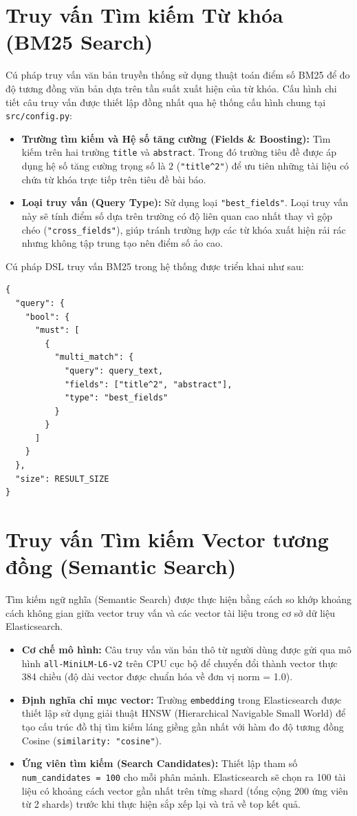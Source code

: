 \section{Truy vấn Tìm kiếm Từ khóa (BM25 Search)}
Cú pháp truy vấn văn bản truyền thống sử dụng thuật toán điểm số BM25 để đo độ tương đồng văn bản dựa trên tần suất xuất hiện của từ khóa. 
Cấu hình chi tiết câu truy vấn được thiết lập đồng nhất qua hệ thống cấu hình chung tại \texttt{src/config.py}:
\begin{itemize}
    \item \textbf{Trường tìm kiếm và Hệ số tăng cường (Fields \& Boosting):} Tìm kiếm trên hai trường \texttt{title} và \texttt{abstract}. Trong đó trường tiêu đề được áp dụng hệ số tăng cường trọng số là $2$ (\texttt{"title\^{}2"}) để ưu tiên những tài liệu có chứa từ khóa trực tiếp trên tiêu đề bài báo.
    \item \textbf{Loại truy vấn (Query Type):} Sử dụng loại \texttt{"best\_fields"}. Loại truy vấn này sẽ tính điểm số dựa trên trường có độ liên quan cao nhất thay vì gộp chéo (\texttt{"cross\_fields"}), giúp tránh trường hợp các từ khóa xuất hiện rải rác nhưng không tập trung tạo nên điểm số ảo cao.
\end{itemize}

Cú pháp DSL truy vấn BM25 trong hệ thống được triển khai như sau:
\begin{lstlisting}[caption={Elasticsearch BM25 Query DSL},label={lst:bm25-dsl}]
{
  "query": {
    "bool": {
      "must": [
        {
          "multi_match": {
            "query": query_text,
            "fields": ["title^2", "abstract"],
            "type": "best_fields"
          }
        }
      ]
    }
  },
  "size": RESULT_SIZE
}
\end{lstlisting}

\section{Truy vấn Tìm kiếm Vector tương đồng (Semantic Search)}
Tìm kiếm ngữ nghĩa (Semantic Search) được thực hiện bằng cách so khớp khoảng cách không gian giữa vector truy vấn và các vector tài liệu trong cơ sở dữ liệu Elasticsearch.
\begin{itemize}
    \item \textbf{Cơ chế mô hình:} Câu truy vấn văn bản thô từ người dùng được gửi qua mô hình \texttt{all-MiniLM-L6-v2} trên CPU cục bộ để chuyển đổi thành vector thực 384 chiều (độ dài vector được chuẩn hóa về đơn vị norm = 1.0).
    \item \textbf{Định nghĩa chỉ mục vector:} Trường \texttt{embedding} trong Elasticsearch được thiết lập sử dụng giải thuật HNSW (Hierarchical Navigable Small World) để tạo cấu trúc đồ thị tìm kiếm láng giềng gần nhất với hàm đo độ tương đồng Cosine (\texttt{similarity: "cosine"}).
    \item \textbf{Ứng viên tìm kiếm (Search Candidates):} Thiết lập tham số \texttt{num\_candidates = 100} cho mỗi phân mảnh. Elasticsearch sẽ chọn ra 100 tài liệu có khoảng cách vector gần nhất trên từng shard (tổng cộng 200 ứng viên từ 2 shards) trước khi thực hiện sắp xếp lại và trả về top kết quả.
\end{itemize}

